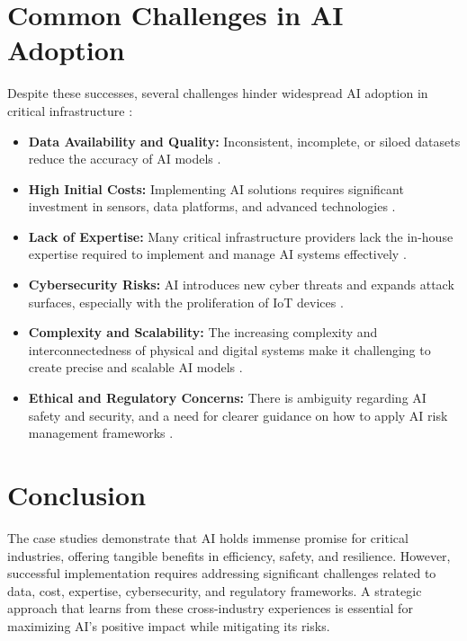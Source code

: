 \section{Common Challenges in AI Adoption}
Despite these successes, several challenges hinder widespread AI adoption in critical infrastructure \parencite{georgetown.edu}:
\begin{itemize}
    \item \textbf{Data Availability and Quality:} Inconsistent, incomplete, or siloed datasets reduce the accuracy of AI models \parencite{uppcsmagazine.com}.
    \item \textbf{High Initial Costs:} Implementing AI solutions requires significant investment in sensors, data platforms, and advanced technologies \parencite{uppcsmagazine.com}.
    \item \textbf{Lack of Expertise:} Many critical infrastructure providers lack the in-house expertise required to implement and manage AI systems effectively \parencite{georgetown.edu}.
    \item \textbf{Cybersecurity Risks:} AI introduces new cyber threats and expands attack surfaces, especially with the proliferation of IoT devices \parencite{checkpoint.com}.
    \item \textbf{Complexity and Scalability:} The increasing complexity and interconnectedness of physical and digital systems make it challenging to create precise and scalable AI models \parencite{elewit.ventures}.
    \item \textbf{Ethical and Regulatory Concerns:} There is ambiguity regarding AI safety and security, and a need for clearer guidance on how to apply AI risk management frameworks \parencite{rand.org}.
\end{itemize}

\section{Conclusion}
The case studies demonstrate that AI holds immense promise for critical industries, offering tangible benefits in efficiency, safety, and resilience. However, successful implementation requires addressing significant challenges related to data, cost, expertise, cybersecurity, and regulatory frameworks. A strategic approach that learns from these cross-industry experiences is essential for maximizing AI's positive impact while mitigating its risks.
